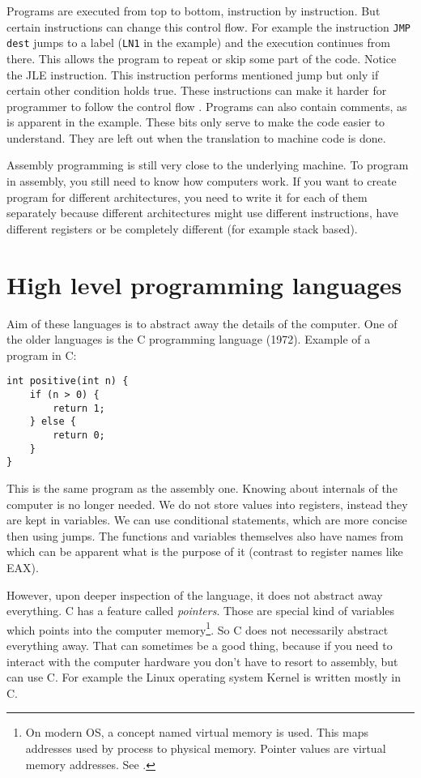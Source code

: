 Programs are executed from top to bottom, instruction by instruction. But certain instructions can change this control flow. For example the instruction \texttt{JMP dest}
jumps to a label (\texttt{LN1} in the example) and the execution continues from there. This allows the program to repeat or skip some part of the code.
Notice the JLE instruction. This instruction performs mentioned jump but only if certain other condition holds true.
These instructions can make it harder for programmer to follow the control flow .
Programs can also contain comments, as is apparent in the example. These bits only serve to make the code easier to understand.
They are left out when the translation to machine code is done.

Assembly programming is still very close to the underlying machine. To program in assembly, you still need to know
how computers work. If you want to create program for different architectures, you need to write it for each of them
separately because different architectures might use different instructions, have different registers or be completely 
different (for example stack based).

\section{High level programming languages}
Aim of these languages is to abstract away the details of the computer. One of the older languages is the C programming language (1972).
Example of a program in C:
\begin{verbatim}
int positive(int n) {
    if (n > 0) {
        return 1;
    } else {
        return 0;
    }
}
\end{verbatim}
This is the same program as the assembly one. Knowing about internals of the computer is no longer needed.
We do not store values into registers, instead they are kept in variables. We can use conditional statements,
which are more concise then using jumps. The functions and variables themselves also have names from which
can be apparent what is the purpose of it (contrast to register names like EAX).

However, upon deeper inspection of the language, it does not abstract away everything. C has a feature called
\textit{pointers}. Those are special kind of variables which points into the computer memory\footnote{On modern OS,
a concept named virtual memory is used. This maps addresses used by process to physical memory. Pointer values are virtual memory addresses. See \cite{modern-os}.}.
So C does not necessarily abstract everything away. That can sometimes be a good thing, because if you need to 
interact with the computer hardware you don't have to resort to assembly, but can use C. For example the Linux
operating system Kernel is written mostly in C.

